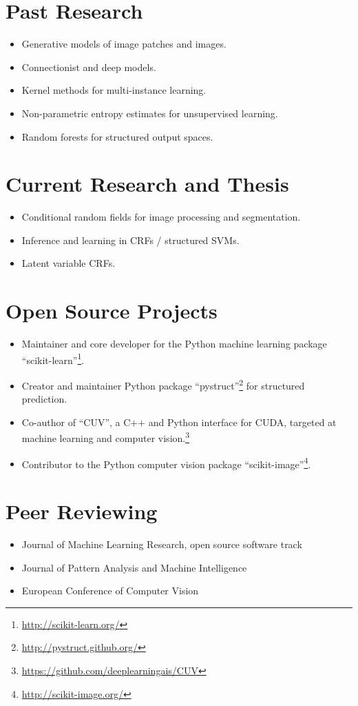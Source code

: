 \documentclass[a4paper,11pt]{article}
\begin{document}
\section{Past Research}
\begin{itemize}
    \item Generative models of image patches and images.
    \item Connectionist and deep models.
    \item Kernel methods for multi-instance learning.
    \item Non-parametric entropy estimates for unsupervised learning.
    \item Random forests for structured output spaces.
\end{itemize}

\section{Current Research and Thesis}
\begin{itemize}
    \item Conditional random fields for image processing and segmentation.
    \item Inference and learning in CRFs / structured SVMs.
    \item Latent variable CRFs.
\end{itemize}

\section{Open Source Projects}
\begin{itemize}
    \item Maintainer and core developer for the Python machine learning package ``scikit-learn''\footnote{\url{http://scikit-learn.org/}}.
    \item Creator and maintainer Python package ``pystruct''\footnote{\url{http://pystruct.github.org/}} for structured prediction.
    \item Co-author of ``CUV'', a C++ and Python interface for CUDA,
        targeted at machine learning and computer vision.\footnote{\url{https://github.com/deeplearningais/CUV}}
    \item Contributor to the Python computer vision package ``scikit-image''\footnote{\url{http://scikit-image.org/}}.
\end{itemize}
\pagebreak

\section{Peer Reviewing}
\begin{itemize}
    \item Journal of Machine Learning Research, open source software track
    \item Journal of Pattern Analysis and Machine Intelligence
    \item European Conference of Computer Vision
\end{itemize}
\end{document}
